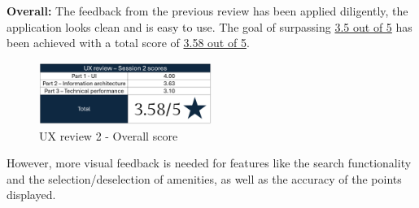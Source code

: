 \textbf{Overall: }
The feedback from the previous review has been applied diligently, the
application looks clean and is easy to use. The goal of surpassing
\underline{3.5 out of 5} has been achieved with a total score of \underline{3.58
    out of 5}.
\begin{figure}[h!]
    \centering
    \includegraphics[width=0.5\textwidth]{images/ux-survey2-summary.png}
    \caption{UX review 2 - Overall score}
\end{figure}

However, more visual feedback is needed for features like the search
functionality and the selection/deselection of amenities, as well as the
accuracy of the points displayed.